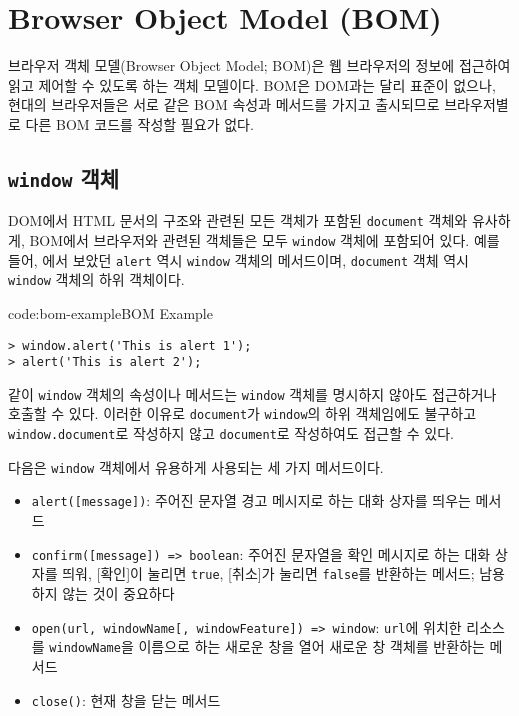 \section{Browser Object Model (BOM)} \label{sect:browser-object-model}

브라우저 객체 모델(Browser Object Model; BOM)은 웹 브라우저의 정보에 접근하여 읽고 제어할 수 있도록 하는 객체 모델이다. BOM은 DOM과는 달리 표준이 없으나, 현대의 브라우저들은 서로 같은 BOM 속성과 메서드를 가지고 출시되므로 브라우저별로 다른 BOM 코드를 작성할 필요가 없다.

\subsection*{\texttt{window} 객체}

DOM에서 HTML 문서의 구조와 관련된 모든 객체가 포함된 \texttt{document} 객체와 유사하게, BOM에서 브라우저와 관련된 객체들은 모두 \texttt{window} 객체에 포함되어 있다. 예를 들어, 에서 보았던 \texttt{alert} 역시 \texttt{window} 객체의 메서드이며, \texttt{document} 객체 역시 \texttt{window} 객체의 하위 객체이다.

\begin{codeenv}{code:bom-example}{BOM Example}\begin{verbatim}
> window.alert('This is alert 1');
> alert('This is alert 2');
\end{verbatim}
\end{codeenv}

\과 같이 \texttt{window} 객체의 속성이나 메서드는 \texttt{window} 객체를 명시하지 않아도 접근하거나 호출할 수 있다. 이러한 이유로 \texttt{document}가 \texttt{window}의 하위 객체임에도 불구하고 \texttt{window.document}로 작성하지 않고 \texttt{document}로 작성하여도 접근할 수 있다.

다음은 \texttt{window} 객체에서 유용하게 사용되는 세 가지 메서드이다.

\begin{itemize}
    \item \texttt{alert([message])}: 주어진 문자열 경고 메시지로 하는 대화 상자를 띄우는 메서드
    \item \texttt{confirm([message]) => boolean}: 주어진 문자열을 확인 메시지로 하는 대화 상자를 띄워, [확인]이 눌리면 \texttt{true}, [취소]가 눌리면 \texttt{false}를 반환하는 메서드; 남용하지 않는 것이 중요하다
    \item \texttt{open(url, windowName[, windowFeature]) => window}: \texttt{url}에 위치한 리소스를 \texttt{windowName}을 이름으로 하는 새로운 창을 열어 새로운 창 객체를 반환하는 메서드
    \item \texttt{close()}: 현재 창을 닫는 메서드
\end{itemize}

